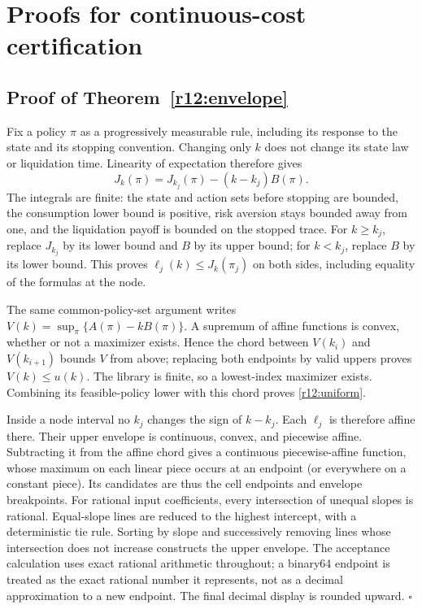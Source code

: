 \section{Proofs for continuous-cost certification}\label{r12:proof}
\subsection{Proof of Theorem~\ref{r12:envelope}}
Fix a policy $\pi$ as a progressively measurable rule, including its response to the state and its stopping convention. Changing only $k$ does not change its state law or liquidation time. Linearity of expectation therefore gives
\[
 J_k(\pi)=J_{k_j}(\pi)-(k-k_j)B(\pi).
\]
The integrals are finite: the state and action sets before stopping are bounded, the consumption lower bound is positive, risk aversion stays bounded away from one, and the liquidation payoff is bounded on the stopped trace. For $k\geq k_j$, replace $J_{k_j}$ by its lower bound and $B$ by its upper bound; for $k<k_j$, replace $B$ by its lower bound. This proves $\ell_j(k)\leq J_k(\pi_j)$ on both sides, including equality of the formulas at the node.

The same common-policy-set argument writes $V(k)=\sup_\pi\{A(\pi)-kB(\pi)\}$. A supremum of affine functions is convex, whether or not a maximizer exists. Hence the chord between $V(k_i)$ and $V(k_{i+1})$ bounds $V$ from above; replacing both endpoints by valid uppers proves $V(k)\leq u(k)$. The library is finite, so a lowest-index maximizer exists. Combining its feasible-policy lower with this chord proves \eqref{r12:uniform}.

Inside a node interval no $k_j$ changes the sign of $k-k_j$. Each $\ell_j$ is therefore affine there. Their upper envelope is continuous, convex, and piecewise affine. Subtracting it from the affine chord gives a continuous piecewise-affine function, whose maximum on each linear piece occurs at an endpoint (or everywhere on a constant piece). Its candidates are thus the cell endpoints and envelope breakpoints. For rational input coefficients, every intersection of unequal slopes is rational. Equal-slope lines are reduced to the highest intercept, with a deterministic tie rule. Sorting by slope and successively removing lines whose intersection does not increase constructs the upper envelope. The acceptance calculation uses exact rational arithmetic throughout; a binary64 endpoint is treated as the exact rational number it represents, not as a decimal approximation to a new endpoint. The final decimal display is rounded upward. \hfill$\square$

